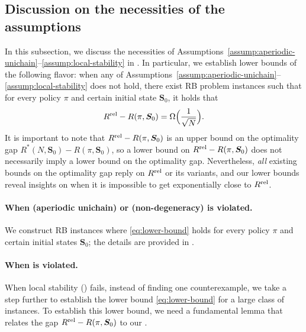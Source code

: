 \documentclass[11pt,letterpaper]{article}
\theoremstyle{plain}
\theoremstyle{definition}
\theoremstyle{remark}
\newcommand{\ve}[1]{\bm{#1}}
\newcommand{\veS}{\ve{S}}
\newcommand{\rel}{\textup{rel}} %
\newcommand{\ravg}{R}
\newcommand{\rsysn}{\ravg(\pi, \veS_0)}
\newcommand{\ropt}{\ravg^*(N, \veS_0)}
\newcommand{\rrel}{\ravg^\rel}
\begin{document}
\subsection{Discussion on the necessities of the assumptions}
\label{sec:results-necessity}

In this subsection, we discuss the necessities of Assumptions~\ref{assump:aperiodic-unichain}--\ref{assump:local-stability} in . 
In particular, we establish lower bounds of the following flavor: when any of Assumptions~\ref{assump:aperiodic-unichain}--\ref{assump:local-stability} does not hold, there exist RB problem instances such that for every policy $\pi$ and certain initial state $\veS_0$, it holds that
\begin{equation}
    \label{eq:lower-bound}
    \rrel - \rsysn = \Omega\Big(\frac{1}{\sqrt{N}}\Big).
\end{equation}
It is important to note that $\rrel - \rsysn$ is an upper bound on the optimality gap $\ropt - \rsysn$, so a lower bound on $\rrel - \rsysn$ does not necessarily imply a lower bound on the optimality gap. 
Nevertheless, \emph{all} existing bounds on the optimality gap reply on $\rrel$ or its variants, and our lower bounds reveal insights on when it is impossible to get exponentially close to $\rrel$. 



\paragraph{When  (aperiodic  unichain) or  (non-degeneracy) is violated.}
We construct RB instances where \eqref{eq:lower-bound} holds for every policy $\pi$ and certain initial states $\veS_0$; the details are provided in . 




\paragraph{When  is violated.}

When local stability () fails, instead of finding one counterexample, we take a step further to establish the lower bound \eqref{eq:lower-bound} for a large class of instances. 
\iffalse
To establish this lower bound, we need a fundamental lemma that relates the gap $\rrel-\rsysn$ to our .
\end{document}
